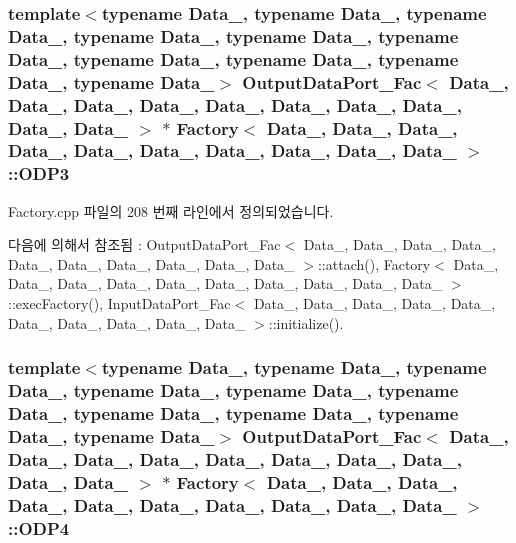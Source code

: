 \subsubsection[{\texorpdfstring{O\+D\+P3}{ODP3}}]{\setlength{\rightskip}{0pt plus 5cm}template$<$typename Data\+\_, typename Data\+\_, typename Data\+\_, typename Data\+\_, typename Data\+\_, typename Data\+\_, typename Data\+\_, typename Data\+\_, typename Data\+\_, typename Data\+\_$>$ {\bf Output\+Data\+Port\+\_\+\+Fac}$<$ Data\+\_, Data\+\_, Data\+\_, Data\+\_, Data\+\_, Data\+\_, Data\+\_, Data\+\_, Data\+\_, Data\+\_ $>$ $\ast$ {\bf Factory}$<$ Data\+\_, Data\+\_, Data\+\_, Data\+\_, Data\+\_, Data\+\_, Data\+\_, Data\+\_, Data\+\_, Data\+\_ $>$\+::O\+D\+P3}\hypertarget{classFactory_a0b72fe47a8a15af6f9dfdeb46c4bc3fc}{}\label{classFactory_a0b72fe47a8a15af6f9dfdeb46c4bc3fc}


Factory.\+cpp 파일의 208 번째 라인에서 정의되었습니다.



다음에 의해서 참조됨 \+:  Output\+Data\+Port\+\_\+\+Fac$<$ Data\+\_, Data\+\_, Data\+\_, Data\+\_, Data\+\_, Data\+\_, Data\+\_, Data\+\_, Data\+\_, Data\+\_ $>$\+::attach(), Factory$<$ Data\+\_, Data\+\_, Data\+\_, Data\+\_, Data\+\_, Data\+\_, Data\+\_, Data\+\_, Data\+\_, Data\+\_ $>$\+::exec\+Factory(), Input\+Data\+Port\+\_\+\+Fac$<$ Data\+\_, Data\+\_, Data\+\_, Data\+\_, Data\+\_, Data\+\_, Data\+\_, Data\+\_, Data\+\_, Data\+\_ $>$\+::initialize().

\subsubsection[{\texorpdfstring{O\+D\+P4}{ODP4}}]{\setlength{\rightskip}{0pt plus 5cm}template$<$typename Data\+\_, typename Data\+\_, typename Data\+\_, typename Data\+\_, typename Data\+\_, typename Data\+\_, typename Data\+\_, typename Data\+\_, typename Data\+\_, typename Data\+\_$>$ {\bf Output\+Data\+Port\+\_\+\+Fac}$<$ Data\+\_, Data\+\_, Data\+\_, Data\+\_, Data\+\_, Data\+\_, Data\+\_, Data\+\_, Data\+\_, Data\+\_ $>$ $\ast$ {\bf Factory}$<$ Data\+\_, Data\+\_, Data\+\_, Data\+\_, Data\+\_, Data\+\_, Data\+\_, Data\+\_, Data\+\_, Data\+\_ $>$\+::O\+D\+P4}\hypertarget{classFactory_a3a94566e0097a4f38401c0d7d11750b1}{}\label{classFactory_a3a94566e0097a4f38401c0d7d11750b1}


